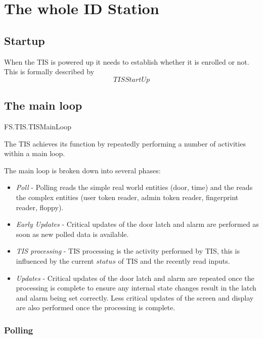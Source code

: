 
\chapter{The whole ID Station}
\label{sec:Whole}

\section{Startup}


When the TIS is powered up it needs to establish whether it is
enrolled or not. This is formally described by
\[
        TISStartUp
\]

\section{The main loop}


\begin{traceunit}{FS.TIS.TISMainLoop}
\end{traceunit}



The TIS achieves its function by repeatedly performing a number of 
activities within a main loop.

The main loop is broken down into several phases:

\begin{itemize}
\item   
{\em Poll} - Polling reads the simple real world entities
(door, time)
and the reads the complex entities
(user token reader, admin token reader, fingerprint reader, floppy).
\item
{\em Early Updates} - Critical updates of the door latch and alarm are
performed as soon as new polled data is available.
\item
{\em TIS processing} - TIS processing is the activity performed by
TIS, this is influenced by the current $status$ of TIS and the
recently read inputs.
\item
{\em Updates} - Critical updates of the door latch and alarm are
repeated once the processing is complete to ensure any internal state
changes result in the latch and alarm being set correctly. Less critical updates of the screen and display
are also performed once the processing is complete.
\end{itemize}

\subsection{Polling}

